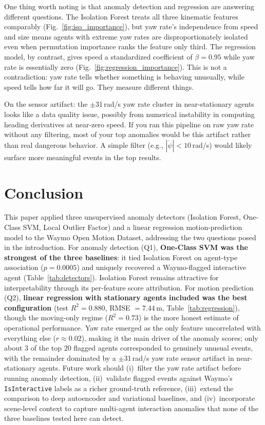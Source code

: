 \documentclass[conference]{IEEEtran}
\begin{document}
One thing worth noting is that anomaly detection and regression are answering different questions. The Isolation Forest treats all three kinematic features comparably (Fig.~\ref{fig:iso_importance}), but yaw rate's independence from speed and size means agents with extreme yaw rates are disproportionately isolated even when permutation importance ranks the feature only third. The regression model, by contrast, gives speed a standardized coefficient of $\beta = 0.95$ while yaw rate is essentially zero (Fig.~\ref{fig:regression_importance}). This is not a contradiction: yaw rate tells whether something is behaving unusually, while speed tells how far it will go. They measure different things.

On the sensor artifact: the $\pm$31\,rad/s yaw rate cluster in near-stationary agents looks like a data quality issue, possibly from numerical instability in computing heading derivatives at near-zero speed. If you ran this pipeline on raw yaw rate without any filtering, most of your top anomalies would be this artifact rather than real dangerous behavior. A simple filter (e.g., $|\dot{\psi}| < 10$\,rad/s) would likely surface more meaningful events in the top results.

\section{Conclusion}

This paper applied three unsupervised anomaly detectors (Isolation Forest, One-Class SVM, Local Outlier Factor) and a linear regression motion-prediction model to the Waymo Open Motion Dataset, addressing the two questions posed in the introduction. For anomaly detection (Q1), \textbf{One-Class SVM was the strongest of the three baselines}: it tied Isolation Forest on agent-type association ($p = 0.0005$) and uniquely recovered a Waymo-flagged interactive agent (Table~\ref{tab:detectors}). Isolation Forest remains attractive for interpretability through its per-feature score attribution. For motion prediction (Q2), \textbf{linear regression with stationary agents included was the best configuration} (test $R^2 = 0.880$, RMSE $= 7.44$\,m, Table~\ref{tab:regression}), though the moving-only regime ($R^2 = 0.73$) is the more honest estimate of operational performance. Yaw rate emerged as the only feature uncorrelated with everything else ($r \approx 0.02$), making it the main driver of the anomaly scores; only about 3 of the top 20 flagged agents corresponded to genuinely unusual events, with the remainder dominated by a $\pm$31\,rad/s yaw rate sensor artifact in near-stationary agents. Future work should (i)~filter the yaw rate artifact before running anomaly detection, (ii)~validate flagged events against Waymo's \texttt{IsInteractive} labels as a richer ground-truth reference, (iii)~extend the comparison to deep autoencoder and variational baselines, and (iv)~incorporate scene-level context to capture multi-agent interaction anomalies that none of the three baselines tested here can detect.



\end{document}
